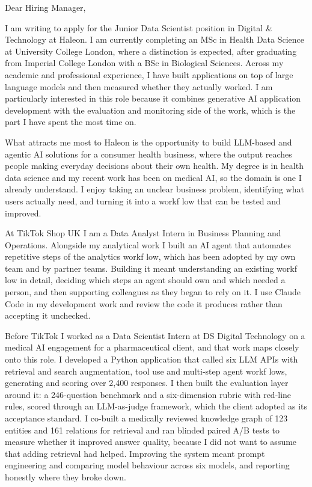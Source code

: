 \documentclass[letterpaper,11pt]{article}
\begin{document}
Dear Hiring Manager,

I am writing to apply for the Junior Data Scientist position in Digital \& Technology at Haleon. I am currently completing an MSc in Health Data Science at University College London, where a distinction is expected, after graduating from Imperial College London with a BSc in Biological Sciences. Across my academic and professional experience, I have built applications on top of large language models and then measured whether they actually worked. I am particularly interested in this role because it combines generative AI application development with the evaluation and monitoring side of the work, which is the part I have spent the most time on.

What attracts me most to Haleon is the opportunity to build LLM-based and agentic AI solutions for a consumer health business, where the output reaches people making everyday decisions about their own health. My degree is in health data science and my recent work has been on medical AI, so the domain is one I already understand. I enjoy taking an unclear business problem, identifying what users actually need, and turning it into a workf\kern0pt low that can be tested and improved.

At TikTok Shop UK I am a Data Analyst Intern in Business Planning and Operations. Alongside my analytical work I built an AI agent that automates repetitive steps of the analytics workf\kern0pt low, which has been adopted by my own team and by partner teams. Building it meant understanding an existing workf\kern0pt low in detail, deciding which steps an agent should own and which needed a person, and then supporting colleagues as they began to rely on it. I use Claude Code in my development work and review the code it produces rather than accepting it unchecked.

Before TikTok I worked as a Data Scientist Intern at DS Digital Technology on a medical AI engagement for a pharmaceutical client, and that work maps closely onto this role. I developed a Python application that called six LLM APIs with retrieval and search augmentation, tool use and multi-step agent workf\kern0pt lows, generating and scoring over 2,400 responses. I then built the evaluation layer around it: a 246-question benchmark and a six-dimension rubric with red-line rules, scored through an LLM-as-judge framework, which the client adopted as its acceptance standard. I co-built a medically reviewed knowledge graph of 123 entities and 161 relations for retrieval and ran blinded paired A/B tests to measure whether it improved answer quality, because I did not want to assume that adding retrieval had helped. Improving the system meant prompt engineering and comparing model behaviour across six models, and reporting honestly where they broke down.
\end{document}
